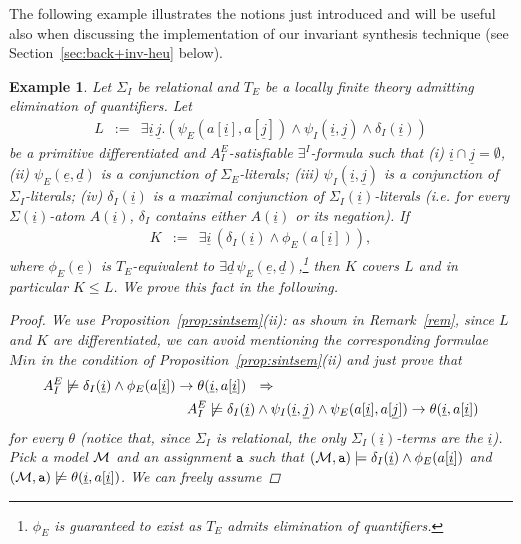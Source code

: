 \documentclass{LMCS}
\newcommand{\ud}{\ensuremath{\underline d}}
\newcommand{\ue}{\ensuremath{\underline e}}
\newcommand{\ui}{\ensuremath{\underline i}}
\newcommand{\uj}{\ensuremath{\underline j}}
\newcommand{\cM}{\ensuremath \mathcal M}
\theoremstyle{plain}\newtheorem{assumption}[thm]{Assumption}
\theoremstyle{plain}\newtheorem{proposition}[thm]{Proposition}
\theoremstyle{plain}\newtheorem{property}[thm]{Property}
\theoremstyle{plain}\newtheorem{example}[thm]{Example}
\theoremstyle{plain}\newtheorem{claim}[thm]{Claim}
\theoremstyle{plain}\newtheorem{lemma}[thm]{Lemma}
\begin{document}
The following example illustrates the notions just introduced and will
be useful also when discussing the implementation of our invariant
synthesis technique (see Section~\ref{sec:back+inv-heu} below).
\begin{example}\em
  \label{ex:cover}
  Let $\Sigma_I$ be relational and $T_E $ be a locally finite theory
  admitting elimination of quantifiers.  Let
  \begin{eqnarray}
    \label{eq:inv_candidate}
    L & := &
    \exists \ui\,\uj.(\psi_E(a[\ui], a[\uj])  \wedge
                    \psi_I(\ui, \uj)        \wedge
                    \delta_I(\ui) )          \end{eqnarray}
  be a primitive differentiated and $A^E_I$-satisfiable
  $\exists^I$-formula such that (i) $\ui\cap \uj=\emptyset$, (ii)
  $\psi_E(\ue, \ud)$ is a conjunction of $\Sigma_E$-literals; (iii)
  $\psi_I(\ui, \uj)$ is a conjunction of $\Sigma_I$-literals; (iv)
  $\delta_I(\ui)$ is a maximal conjunction of $\Sigma_I(\ui)$-literals
  (i.e. for every $\Sigma(\ui)$-atom $A(\ui)$, $\delta_I$ contains
  either $A(\ui)$ or its negation).  If
  \begin{eqnarray}
    \label{eq:res}
    K &:=& \exists \ui \,(\delta_I(\ui)\wedge \phi_E(a[\ui])),
  \end{eqnarray}
  where $\phi_E(\ue)$ is $T_E$-equivalent to $\exists \ud\,
  \psi_E(\ue, \ud)$,\footnote{$\phi_E$ is guaranteed to exist as $T_E$
    admits elimination of quantifiers.} then $K$ covers $L$ and in
  particular $K\leq L$.  We prove this fact in the following.
  \begin{proof}
    We use Proposition~\ref{prop:sintsem}(ii): as shown in
    Remark~\ref{rem}, since $L$ and $K$ are differentiated, we can
    avoid mentioning the corresponding formulae $Min$ in the condition
    of Proposition~\ref{prop:sintsem}(ii) and just prove that
    \begin{eqnarray*}
      & A^E_I\not \models
      \delta_I(\ui)\wedge \phi_E(a[\ui])\to \theta(\ui, a[\ui]) ~~
      \Rightarrow~  \\
      &~\hskip 3.5cm A^E_I\not \models  \delta_I(\ui)\wedge \psi_I(\ui, \uj)\wedge \psi_E(a[\ui], a[\uj]) \to
      \theta(\ui, a[\ui])
    \end{eqnarray*}
    for every $\theta$ (notice that, since $\Sigma_I$ is relational,
    the only $\Sigma_I(\ui)$-terms are the $\ui$).  Pick a model $\cM$
    and an assignment $\mathtt{a}$ such that $(\cM,
    \mathtt{a})\models\delta_I(\ui)\wedge \phi_E(a[\ui])$ and $(\cM,
    \mathtt{a})\not\models\theta(\ui, a[\ui])$. We can freely assume

\end{proof}
\end{example}
\end{document}
